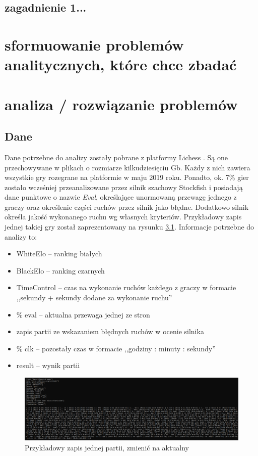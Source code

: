 \documentclass[inzynierska]{pwr_wmat_praca_dyplomowa}
\theoremstyle{plain}
\numberwithin{theorem}{chapter}
\theoremstyle{definition}
\numberwithin{theorem}{chapter}
\begin{document}
\section{zagadnienie 1...}

\chapter{sformuowanie problemów analitycznych, które chce zbadać}

\chapter{analiza / rozwiązanie problemów}
\section{Dane}
Dane potrzebne do analizy zostały pobrane z platformy Lichess \cite{lichess}. Są one przechowywane w plikach o rozmiarze kilkudziesięciu Gb. Każdy z nich zawiera wszystkie gry rozegrane na platformie w maju 2019 roku. Ponadto, ok. 7\% gier zostało wcześniej przeanalizowane przez silnik szachowy Stockfish i posiadają dane punktowe o nazwie \textit{Eval}, określające unormowaną przewagę jednego z graczy oraz określenie części ruchów przez silnik jako błędne. Dodatkowo silnik określa jakość wykonanego ruchu wg własnych kryteriów. Przykładowy zapis jednej takiej gry został zaprezentowany na rysunku \ref{rys:zapis_gry}. Informacje potrzebne do analizy to:
\begin{itemize}
	\item WhiteElo -- ranking białych
	\item BlackElo -- ranking czarnych
	\item TimeControl -- czas na wykonanie ruchów każdego z graczy w formacie  ,,sekundy + sekundy dodane za wykonanie ruchu''
	\item \% eval -- aktualna przewaga jednej ze stron
	\item zapis partii ze wskazaniem błędnych ruchów w ocenie silnika
	\item \% clk -- pozostały czas w formacie ,,godziny : minuty : sekundy''
	\item result -- wynik partii
\end{itemize}

\begin{figure}[H]
	\centering
	\includegraphics[width=\textwidth]{zapis_gry.png}
	\caption{Przykładowy zapis jednej partii, zmienić na aktualny}
	\label{rys:zapis_gry} 
\end{figure}
\end{document}
